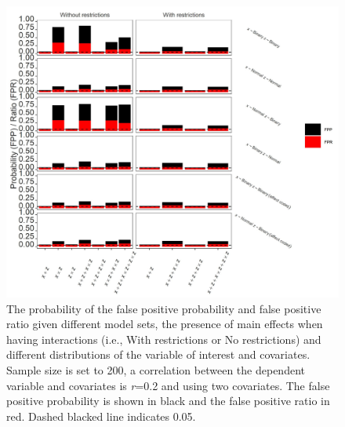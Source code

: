 \begin{figure}[hbt!]
\includegraphics[scale=0.95]{R/Analysis/Result/Figures/Figure1ASI.jpeg}
\centering
\caption{The probability of the false positive probability and false positive ratio given different model sets, the presence of main effects when having interactions (i.e., With restrictions or No restrictions) and different distributions of the variable of interest and covariates. Sample size is set to 200, a correlation between the dependent variable and covariates is \textit{r}=0.2 and using two covariates. The false positive probability is shown in black and the false positive ratio in red. Dashed blacked line indicates 0.05.}
\label{fig:appfigure1}
\end{figure}

\begin{landscape}

\end{landscape}

